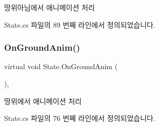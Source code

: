 땅위아님에서 애니메이션 처리 



State.\+cs 파일의 89 번째 라인에서 정의되었습니다.


\begin{DoxyCode}{0}

\end{DoxyCode}
\mbox{\label{class_state_adc5e7be4e977f0a64b29b01171eda8af}} 
\subsubsection{\texorpdfstring{OnGroundAnim()}{OnGroundAnim()}}
{\footnotesize\ttfamily virtual void State.\+On\+Ground\+Anim (\begin{DoxyParamCaption}{ }\end{DoxyParamCaption})\hspace{0.3cm}{\ttfamily [inline]}, {\ttfamily [virtual]}}



땅위에서 애니메이션 처리 



State.\+cs 파일의 76 번째 라인에서 정의되었습니다.


